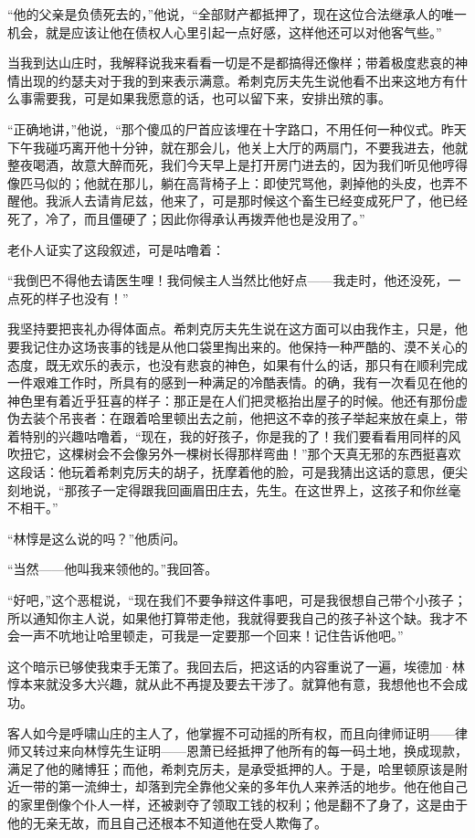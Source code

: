 \par “他的父亲是负债死去的，”他说，“全部财产都抵押了，现在这位合法继承人的唯一机会，就是应该让他在债权人心里引起一点好感，这样他还可以对他客气些。”
\par 当我到达山庄时，我解释说我来看看一切是不是都搞得还像样；带着极度悲哀的神情出现的约瑟夫对于我的到来表示满意。希刺克厉夫先生说他看不出来这地方有什么事需要我，可是如果我愿意的话，也可以留下来，安排出殡的事。
\par “正确地讲，”他说，“那个傻瓜的尸首应该埋在十字路口，不用任何一种仪式。昨天下午我碰巧离开他十分钟，就在那会儿，他关上大厅的两扇门，不要我进去，他就整夜喝酒，故意大醉而死，我们今天早上是打开房门进去的，因为我们听见他哼得像匹马似的；他就在那儿，躺在高背椅子上：即使咒骂他，剥掉他的头皮，也弄不醒他。我派人去请肯尼兹，他来了，可是那时候这个畜生已经变成死尸了，他已经死了，冷了，而且僵硬了；因此你得承认再拨弄他也是没用了。”
\par 老仆人证实了这段叙述，可是咕噜着：
\par “我倒巴不得他去请医生哩！我伺候主人当然比他好点——我走时，他还没死，一点死的样子也没有！”
\par 我坚持要把丧礼办得体面点。希刺克厉夫先生说在这方面可以由我作主，只是，他要我记住办这场丧事的钱是从他口袋里掏出来的。他保持一种严酷的、漠不关心的态度，既无欢乐的表示，也没有悲哀的神色，如果有什么的话，那只有在顺利完成一件艰难工作时，所具有的感到一种满足的冷酷表情。的确，我有一次看见在他的神色里有着近乎狂喜的样子：那正是在人们把灵柩抬出屋子的时候。他还有那份虚伪去装个吊丧者：在跟着哈里顿出去之前，他把这不幸的孩子举起来放在桌上，带着特别的兴趣咕噜着，“现在，我的好孩子，你是我的了！我们要看看用同样的风吹扭它，这棵树会不会像另外一棵树长得那样弯曲！”那个天真无邪的东西挺喜欢这段话：他玩着希刺克厉夫的胡子，抚摩着他的脸，可是我猜出这话的意思，便尖刻地说，“那孩子一定得跟我回画眉田庄去，先生。在这世界上，这孩子和你丝毫不相干。”
\par “林惇是这么说的吗？”他质问。
\par “当然——他叫我来领他的。”我回答。
\par “好吧，”这个恶棍说，“现在我们不要争辩这件事吧，可是我很想自己带个小孩子；所以通知你主人说，如果他打算带走他，我就得要我自己的孩子补这个缺。我才不会一声不吭地让哈里顿走，可我是一定要那一个回来！记住告诉他吧。”
\par 这个暗示已够使我束手无策了。我回去后，把这话的内容重说了一遍，埃德加·林惇本来就没多大兴趣，就从此不再提及要去干涉了。就算他有意，我想他也不会成功。
\par 客人如今是呼啸山庄的主人了，他掌握不可动摇的所有权，而且向律师证明——律师又转过来向林惇先生证明——恩萧已经抵押了他所有的每一码土地，换成现款，满足了他的赌博狂；而他，希刺克厉夫，是承受抵押的人。于是，哈里顿原该是附近一带的第一流绅士，却落到完全靠他父亲的多年仇人来养活的地步。他在他自己的家里倒像个仆人一样，还被剥夺了领取工钱的权利；他是翻不了身了，这是由于他的无亲无故，而且自己还根本不知道他在受人欺侮了。

